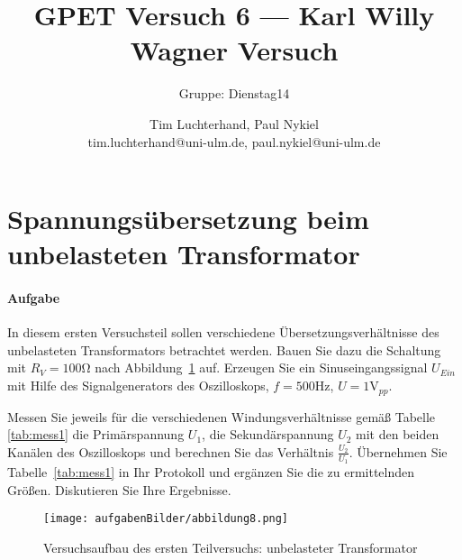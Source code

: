 \documentclass[10pt]{scrreprt}
\author{Tim Luchterhand, Paul Nykiel \protect\\ tim.luchterhand@uni-ulm.de, paul.nykiel@uni-ulm.de}
\title{GPET Versuch 6 --- Karl Willy Wagner Versuch}
\subtitle{Gruppe: Dienstag14}
\begin{document}
        \maketitle
        \section{Spannungsübersetzung beim unbelasteten Transformator}
        \paragraph{Aufgabe}
        In diesem ersten Versuchsteil sollen verschiedene Übersetzungsverhältnisse des
        unbelasteten Transformators betrachtet werden. Bauen Sie dazu die Schaltung mit $R_V = 100\si{\ohm}$
        nach Abbildung~\ref{fig:abb8} auf. Erzeugen Sie ein Sinuseingangssignal $U_{Ein}$ mit Hilfe des Signalgenerators
        des Oszilloskops, $f = 500\si{\hertz}$, $U = 1\si{\volt}_{pp}$.

        \vspace{0.5cm}

        Messen Sie jeweils für die verschiedenen Windungsverhältnisse gemäß Tabelle \ref{tab:mess1} die
        Primärspannung $U_1$, die Sekundärspannung $U_2$ mit den beiden Kanälen des Oszilloskops und
        berechnen Sie das Verhältnis $\frac{U_2}{U_1}$. Übernehmen Sie Tabelle~\ref{tab:mess1} in Ihr Protokoll und ergänzen
        Sie die zu ermittelnden Größen. Diskutieren Sie Ihre Ergebnisse.

        \begin{center}
            \begin{figure}[H]
                \texttt{[image: aufgabenBilder/abbildung8.png]}
                \caption{Versuchsaufbau des ersten Teilversuchs: unbelasteter Transformator}
                \label{fig:abb8}
            \end{figure}
        \end{center}
\end{document}
